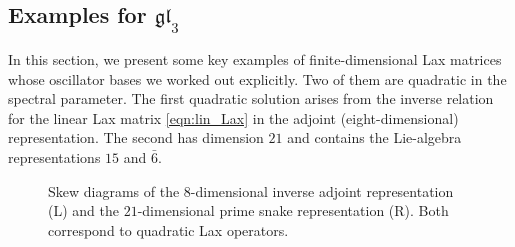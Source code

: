 \documentclass[12pt,reqno]{amsart}
\numberwithin{equation}{section}
\begin{document}
\subsection{Examples for \texorpdfstring{$\mathfrak{gl}_3$}{gl₃}}
In this section, we present some key examples of finite-dimensional Lax matrices whose oscillator bases we worked out explicitly. Two of them are quadratic in the spectral parameter. The first quadratic solution arises from the inverse relation for the linear Lax matrix \eqref{eqn:lin_Lax} in the adjoint (eight-dimensional) representation. The second has dimension $21$ and contains the Lie-algebra representations $15$ and $\bar{6}$.
\begin{figure}[htbp]
	\centering
	
	
	\caption{
		Skew diagrams of the $8$-dimensional inverse adjoint representation (L)
		and the $21$-dimensional prime snake representation (R).
		Both correspond to quadratic Lax operators.
	}
	\label{fig:skew_diagrams_quadratic_lax}
	
\end{figure}
\end{document}
